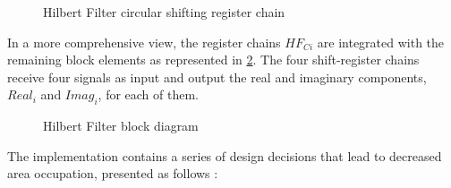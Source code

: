 \begin{figure}[!htbp]
	\captionsetup{justification=centering,margin=2cm}
	\caption{Hilbert Filter circular shifting register chain}
	\label{fig:hilbert-chai}
\end{figure}

In a more comprehensive view, the register chains $HF_{Ci}$ are integrated with the remaining block elements as represented in \ref{fig:hilbert-all}. The four shift-register chains receive four signals as input and output the real and imaginary components, $Real_i$ and $Imag_i$, for each of them.

\begin{figure}[!htbp]
	\captionsetup{justification=centering,margin=2cm}
	\caption{Hilbert Filter block diagram}
	\label{fig:hilbert-all}
\end{figure}

The implementation contains a series of design decisions that lead to decreased area occupation, presented as follows :

